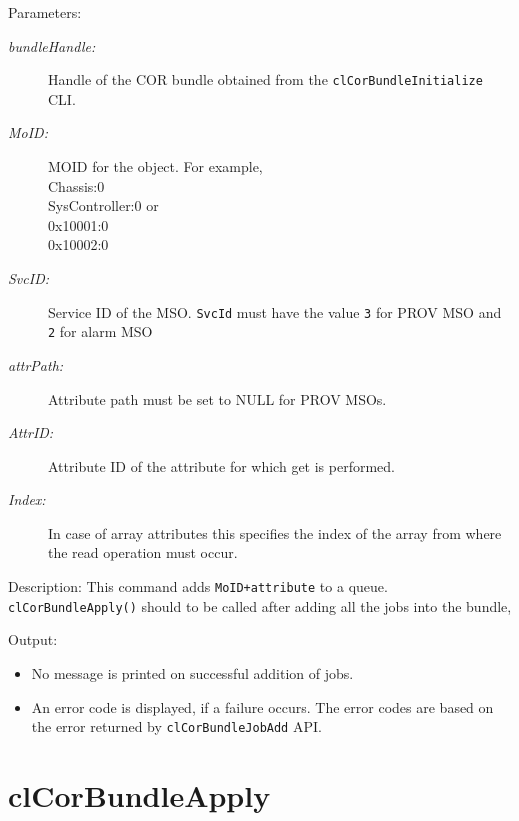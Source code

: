 \begin{flushleft}
\begin{Desc}
\item
[Parameters:]
\begin{description}
\item[{\em bundle\-Handle:}] Handle of the COR bundle obtained from the {\tt{clCorBundleInitialize}} CLI.
\item[{\em Mo\-ID:}] MOID for the object. For example, \\Chassis:0\\SysController:0 or \\0x10001:0\\0x10002:0
\item[{\em Svc\-ID:}] Service ID of the MSO. {\tt{SvcId}} must have the value {\tt{3}} for PROV MSO and {\tt{2}} for alarm MSO
\item[{\em attr\-Path:}] Attribute path must be set to NULL for PROV MSOs.
\item[{\em Attr\-ID:}] Attribute ID of the attribute for which get is performed.
\item[{\em Index:}] In case of array attributes this specifies the index of the array from where the read operation must occur.
\end{description}
\end{Desc}
\begin{Desc}
\item
[Description:] 
This command adds {\tt{MoID+attribute}} to a queue.
{\tt{clCorBundleApply()}} should to be called after adding all the jobs into the bundle,
\end{Desc}	
\begin{Desc}
\item
[Output:] 
\begin{itemize}
\item
No message is printed on successful addition of jobs.
\item
An error code is displayed, if a failure occurs. The error codes are based on the error returned by {\tt{clCorBundleJobAdd}} API.
\end{itemize}
\end{Desc}


\section{clCorBundleApply}


\end{flushleft}
